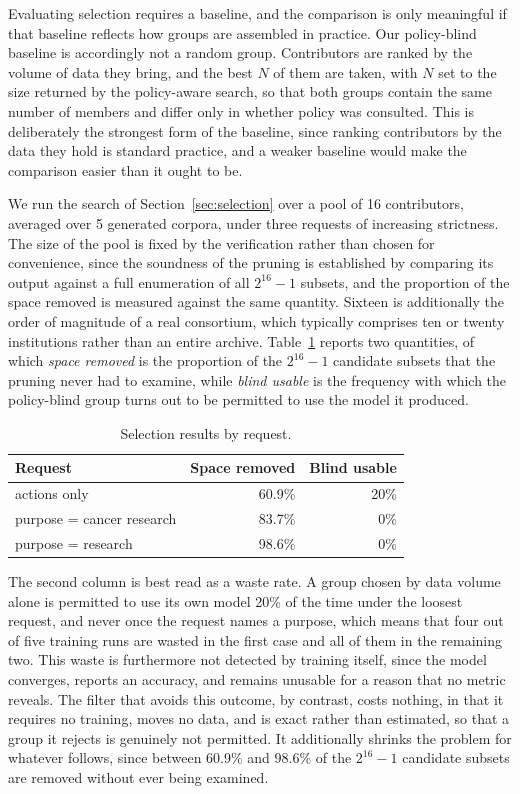 \documentclass[sigconf,anonymous,review]{acmart}
\begin{document}
Evaluating selection requires a baseline, and the comparison is only meaningful
if that baseline reflects how groups are assembled in practice. Our policy-blind
baseline is accordingly not a random group. Contributors are ranked by the volume
of data they bring, and the best $N$ of them are taken, with $N$ set to the size
returned by the policy-aware search, so that both groups contain the same number
of members and differ only in whether policy was consulted. This is deliberately
the strongest form of the baseline, since ranking contributors by the data they
hold is standard practice, and a weaker baseline would make the comparison easier
than it ought to be.

We run the search of Section~\ref{sec:selection} over a pool of 16 contributors,
averaged over 5 generated corpora, under three requests of increasing strictness.
The size of the pool is fixed by the verification rather than chosen for
convenience, since the soundness of the pruning is established by comparing its
output against a full enumeration of all $2^{16}-1$ subsets, and the proportion
of the space removed is measured against the same quantity. Sixteen is
additionally the order of magnitude of a real consortium, which typically
comprises ten or twenty institutions rather than an entire archive.
Table~\ref{tab:selection} reports two quantities, of which \emph{space removed}
is the proportion of the $2^{16}-1$ candidate subsets that the pruning never had
to examine, while \emph{blind usable} is the frequency with which the
policy-blind group turns out to be permitted to use the model it produced.

\begin{table}[h]
\caption{Selection results by request.}
\label{tab:selection}
\begin{tabular}{lrr}
\toprule
Request & Space removed & Blind usable \\
\midrule
actions only & 60.9\% & 20\% \\
purpose = cancer research & 83.7\% & 0\% \\
purpose = research & 98.6\% & 0\% \\
\bottomrule
\end{tabular}
\end{table}

The second column is best read as a waste rate. A group chosen by data volume
alone is permitted to use its own model 20\% of the time under the loosest
request, and never once the request names a purpose, which means that four out of
five training runs are wasted in the first case and all of them in the remaining
two. This waste is furthermore not detected by training itself, since the model
converges, reports an accuracy, and remains unusable for a reason that no metric
reveals. The filter that avoids this outcome, by contrast, costs nothing, in that
it requires no training, moves no data, and is exact rather than estimated, so
that a group it rejects is genuinely not permitted. It additionally shrinks the
problem for whatever follows, since between 60.9\% and 98.6\% of the $2^{16}-1$
candidate subsets are removed without ever being examined.
\end{document}
